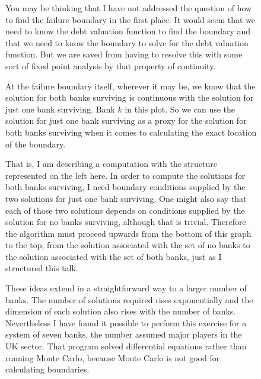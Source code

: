 \documentclass[a4paper,11pt]{article}
\begin{document}
  \begin{figure}[H]
    \begin{center}
    \end{center}
    \ttfamily
    You may be thinking that I have not addressed the question of how to find the failure boundary in the first place.
    It would seem that we need to know the debt valuation function to find the boundary
    and that we need to know the boundary to solve for the debt valuation function.
    But we are saved from having to resolve this with some sort of fixed point analysis by that property of continuity.

    At the failure boundary itself, wherever it may be, we know that the solution for both banks surviving is continuous with the solution for just one bank surviving.
    Bank $k$ in this plot.
    So we can use the solution for just one bank surviving as a proxy for the solution for both banks surviving
    when it comes to calculating the exact location of the boundary.
  \end{figure}
  \begin{figure}[H]
    \begin{center}
    \end{center}
    \ttfamily
    That is, I am describing a computation with the structure represented on the left here.
    In order to compute the solutions for both banks surviving,
    I need boundary conditions supplied by the two solutions for just one bank surviving.
    One might also say that each of those two solutions depends on conditions supplied by the solution for no banks surviving, although that is trivial.
    Therefore the algorithm must proceed upwards from the bottom of this graph to the top,
    from the solution associated with the set of no banks to the solution associated with the set of both banks,
    just as I structured this talk.

    These ideas extend in a straightforward way to a larger number of banks.
    The number of solutions required rises exponentially and the dimension of each solution also rises with the number of banks.
    Nevertheless I have found it possible to perform this exercise for a system of seven banks, the number assumed major players in the UK sector.
    That program solved differential equations rather than running Monte Carlo, because Monte Carlo is not good for calculating boundaries.
  \end{figure}
\end{document}
